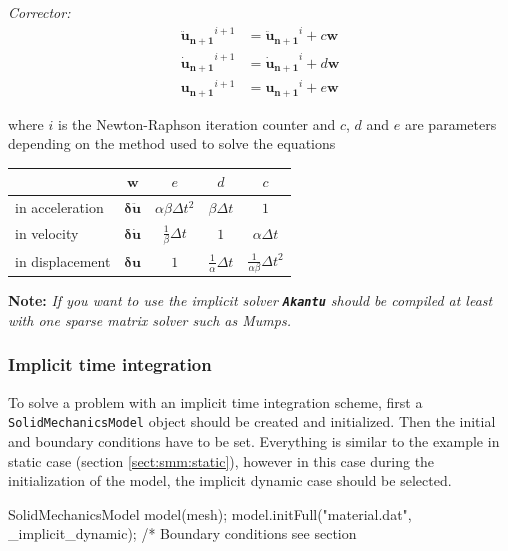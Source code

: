 \documentclass[a4paper,11pt]{book}
\newcommand{\akantu}{{\texttt{\textbf{Akantu}}}\xspace}
\newcommand{\code}[1]{\texttt{#1}}
\newcommand{\note}[1]{\textbf{Note: }\textit{#1}}
\renewcommand{\vec}[1]{\ensuremath{\boldsymbol{#1}}}
\begin{document}
\noindent\textit{Corrector:}
\begin{align}
  \vec{\ddot{u}_{n+1}}^{i+1} &= \vec{\ddot{u}_{n+1}}^{i} + c \vec{w} \\
  \vec{\dot{u}_{n+1}}^{i+1} &= \vec{\dot{u}_{n+1}}^{i} + d \vec{w} \\
  \vec{u_{n+1}}^{i+1} &= \vec{u_{n+1}}^{i} + e \vec{w}
\end{align}

where  $i$ is  the Newton-Raphson  iteration counter  and $c$,  $d$ and  $e$ are
parameters depending on the method used to solve the equations

\begin{center}
  \begin{tabular}{lcccc}
    \toprule
    & $\vec{w}$ & $e$ & $d$ & $c$\\
    \midrule
    in  acceleration  &$ \vec{\delta  \ddot{u}}$  &  $\alpha  \beta \Delta  t^2$
    &$\beta \Delta t$ &$1$\\
    in velocity  & $ \vec{\delta \dot{u}}$&  $\frac{1}{\beta} \Delta t$  & $1$ &
    $\alpha \Delta t$\\
    in displacement  &$\vec{\delta u}$  & $ 1$  & $\frac{1}{\alpha} \Delta  t$ &
    $\frac{1}{\alpha \beta} \Delta t^2$\\
    \bottomrule
  \end{tabular}
\end{center}

\note{If you want to use the implicit solver \akantu should be compiled at least
  with one sparse matrix solver such as Mumps\cite{mumps}.}


\subsubsection{Implicit time integration}
To  solve  a  problem with  an  implicit  time  integration scheme,  first  a
\code{SolidMechanicsModel} object  should be created and  initialized.  Then the
initial and  boundary conditions have to  be set.  Everything is  similar to the
example  in static case  (section \ref{sect:smm:static}),  however in  this case
during  the initialization of  the model,  the implicit  dynamic case  should be
selected.

\begin{cpp}
  SolidMechanicsModel model(mesh);
  model.initFull("material.dat", _implicit_dynamic);
  /* Boundary conditions see section %
\end{cpp}
\end{document}
